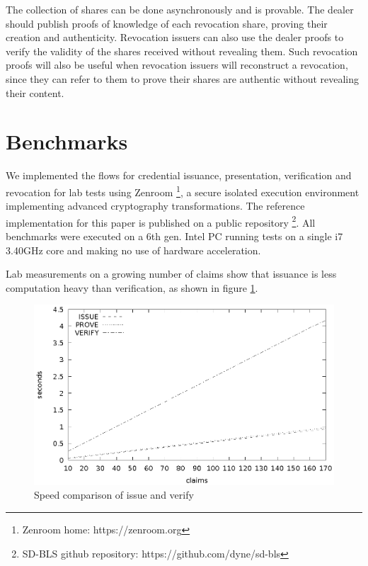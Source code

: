 The collection of shares can be done asynchronously and is provable.
The dealer should publish proofs of knowledge of each revocation
share, proving their creation and authenticity. Revocation issuers can
also use the dealer proofs to verify the validity of the shares
received without revealing them. Such revocation proofs will also be
useful when revocation issuers will reconstruct a revocation, since
they can refer to them to prove their shares are authentic without
revealing their content.

\section{Benchmarks}

We implemented the flows for credential issuance, presentation,
verification and revocation for lab tests using
Zenroom \footnote{Zenroom home: https://zenroom.org}, a secure
isolated execution environment implementing advanced cryptography
transformations. The reference implementation for this paper is
published on a public repository \footnote{SD-BLS github repository:
https://github.com/dyne/sd-bls}. All benchmarks were executed on a 6th
gen. Intel PC running tests on a single i7 3.40GHz core and making no
use of hardware acceleration.

Lab measurements on a growing number of claims show that issuance is
less computation heavy than verification, as shown in figure
\ref{fig:issueproveverify}.

\begin{figure}
    \centering
    \includegraphics[width=1\linewidth]{issueproveverify.eps}

    \caption{Speed comparison of issue and verify}
    \label{fig:issueproveverify}
\end{figure}

